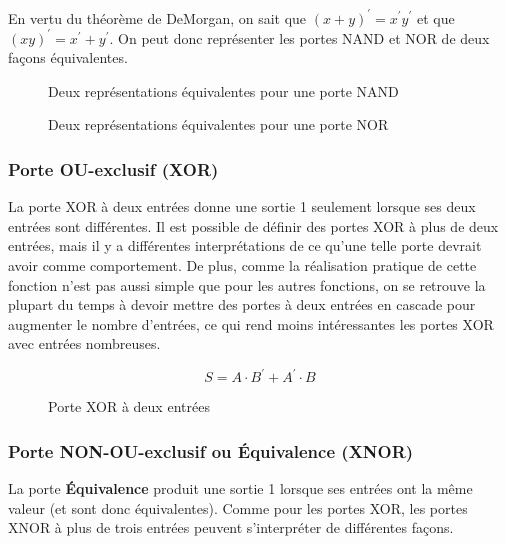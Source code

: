 \documentclass[11pt]{article}
\begin{document}
En vertu du théorème de DeMorgan, on sait que \((x + y)^{\prime} =
x^{\prime} y^{\prime}\) et que \((xy)^{\prime} = x^{\prime} +
y^{\prime}\). On peut donc représenter les portes NAND et NOR de deux
façons équivalentes.

\begin{figure}[htbp]
\centering

\caption{\label{fig:org1ecb47a}Deux représentations équivalentes pour une porte NAND}
\end{figure}

\begin{figure}[htbp]
\centering

\caption{\label{fig:org965404f}Deux représentations équivalentes pour une porte NOR}
\end{figure}

\subsubsection{Porte OU-exclusif (XOR)}
\label{sec:orgf2f5381}

La porte XOR à deux entrées donne une sortie 1 seulement lorsque ses
deux entrées sont différentes. Il est possible de définir des portes
XOR à plus de deux entrées, mais il y a différentes interprétations de
ce qu'une telle porte devrait avoir comme comportement. De plus, comme
la réalisation pratique de cette fonction n'est pas aussi simple que
pour les autres fonctions, on se retrouve la plupart du temps à devoir
mettre des portes à deux entrées en cascade pour augmenter le nombre
d'entrées, ce qui rend moins intéressantes les portes XOR avec entrées
nombreuses.

$$ S= A \cdot B^\prime + A^\prime \cdot B $$  

\begin{figure}[htbp]
\centering

\caption{\label{fig:org323f73e}Porte XOR à deux entrées}
\end{figure}

\subsubsection{Porte NON-OU-exclusif ou Équivalence (XNOR)}
\label{sec:org7a57e12}

La porte \textbf{Équivalence} produit une sortie 1 lorsque ses entrées ont la
même valeur (et sont donc équivalentes). Comme pour les portes XOR,
les portes XNOR à plus de trois entrées peuvent s'interpréter de
différentes façons.
\end{document}
